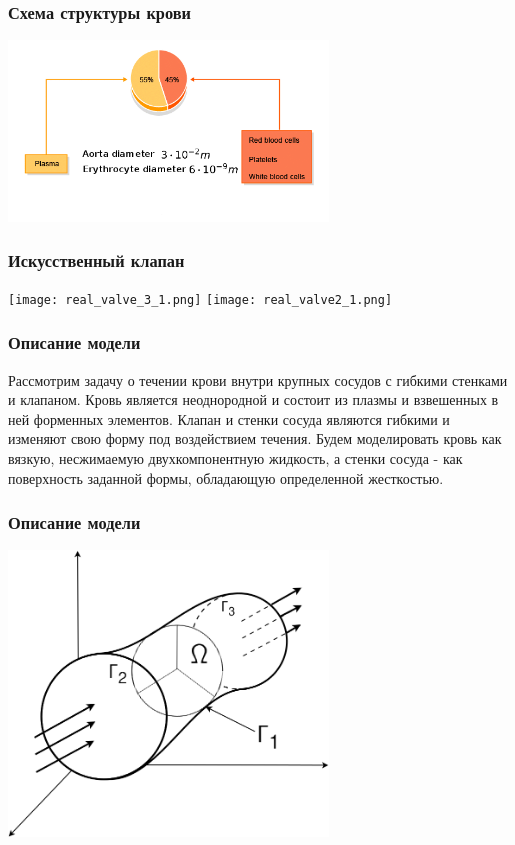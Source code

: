 \documentclass[14pt]{beamer}
\begin{document}
\begin{frame}
\frametitle{Схема структуры крови}
    \begin{center}
        \includegraphics[width=8.5cm]{blood_scheme3.png}
    \end{center}
\end{frame}

\begin{frame}
\frametitle{Искусственный клапан}
    \begin{center}
        \texttt{[image: real\_valve\_3\_1.png]}
        \texttt{[image: real\_valve2\_1.png]}
    \end{center}
\end{frame}

\begin{frame}
\frametitle{Описание модели}
Рассмотрим задачу о течении крови внутри крупных сосудов с гибкими стенками и клапаном. Кровь является неоднородной и состоит из плазмы и взвешенных в ней форменных элементов. Клапан и стенки сосуда являются гибкими и изменяют свою форму под воздействием течения. Будем моделировать кровь как вязкую, несжимаемую двухкомпонентную жидкость, а стенки сосуда - как поверхность заданной формы, обладающую определенной жесткостью.
\end{frame}

\begin{frame}
\frametitle{Описание модели}
    \begin{center}
        \includegraphics[width=8.5cm]{area_3d.png}
    \end{center}
\end{frame}
\end{document}
